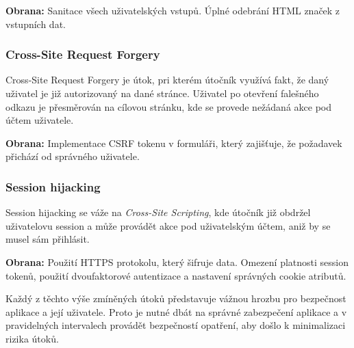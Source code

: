 \textbf{Obrana:} Sanitace všech uživatelských vstupů. Úplné odebrání HTML značek z vstupních dat.

\subsubsection*{Cross-Site Request Forgery}
\label{subsubsec:security-attacks-cross-site-request-forgery}
Cross-Site Request Forgery je útok, pri kterém útočník využívá fakt, že daný uživatel je již autorizovaný na dané stránce. Uživatel po otevření falešného odkazu je přesměrován na cílovou stránku, kde se provede nežádaná akce pod účtem uživatele.

\textbf{Obrana:} Implementace CSRF tokenu v formuláři, který zajišťuje, že požadavek přichází od správného uživatele.

\subsubsection*{Session hijacking}
\label{subsubsec:security-attacks-session-hijacking}
Session hijacking se váže na \textit{Cross-Site Scripting}, kde útočník již obdržel uživatelovu session a může provádět akce pod uživatelským účtem, aniž by se musel sám přihlásit.

\textbf{Obrana:} Použití HTTPS protokolu, který šifruje data. Omezení platnosti session tokenů, použití dvoufaktorové autentizace a nastavení správných cookie atributů.
\newline

Každý z těchto výše zmíněných útoků představuje vážnou hrozbu pro bezpečnost aplikace a její uživatele. Proto je nutné dbát na správné zabezpečení aplikace a v pravidelných intervalech provádět bezpečností opatření, aby došlo k minimalizaci rizika útoků.

\endinput
